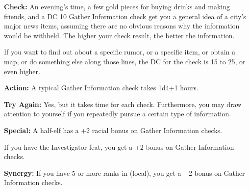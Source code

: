 \textbf{Check:} An evening's time, a few gold pieces for buying drinks and making friends, and a DC 10 Gather Information check get you a general idea of a city's major news items, assuming there are no obvious reasons why the information would be withheld. The higher your check result, the better the information.

If you want to find out about a specific rumor, or a specific item, or obtain a map, or do something else along those lines, the DC for the check is 15 to 25, or even higher.

\textbf{Action:} A typical Gather Information check takes 1d4+1 hours.

\textbf{Try Again:} Yes, but it takes time for each check. Furthermore, you may draw attention to yourself if you repeatedly pursue a certain type of information.

\textbf{Special:} A half-elf has a +2 racial bonus on Gather Information checks.

If you have the Investigator feat, you get a +2 bonus on Gather Information checks.

\textbf{Synergy:} If you have 5 or more ranks in  (local), you get a +2 bonus on Gather Information checks.